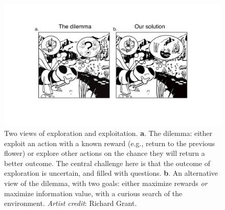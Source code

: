 \begin{figure}
	\includegraphics[width=.9\linewidth]{img/bee.pdf} 
	\caption{Two views of exploration and exploitation. \textbf{a}. The dilemma: either exploit an action with a known reward (e.g., return to the previous flower) or explore other actions on the chance they will return a better outcome. The central challenge here is that the outcome of exploration is uncertain, and filled with questions. \textbf{b}. An alternative view of the dilemma, with two goals: either maximize rewards \textit{or} maximize information value, with a curious search of the environment. \textit{Artist credit}: Richard Grant.}
	\label{fig:bee} 
\end{figure}

